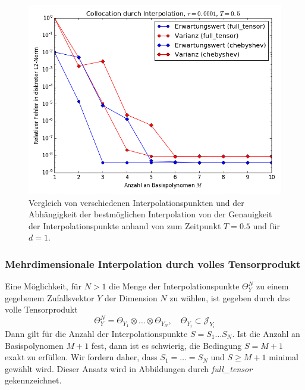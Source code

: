 \begin{mathbsp}
\begin{figure}[!htb]
\endminipage
{}
  \includegraphics[width=\linewidth]{Figures/collocation_mi_trial1_tau0001.png}
\endminipage
\caption{Vergleich von verschiedenen Interpolationspunkten und der Abhängigkeit der bestmöglichen Interpolation von der Genauigkeit der Interpolationspunkte anhand von  zum Zeitpunkt $T=0.5$ und für $d=1$.}
\label{fig:Kollokation_trial1}
\end{figure}
\end{mathbsp}
\subsubsection*{Mehrdimensionale Interpolation durch volles Tensorprodukt}
Eine Möglichkeit, für $N>1$ die Menge der Interpolationspunkte $\Theta_Y^N$ zu einem gegebenem Zufallsvektor $Y$ der Dimension $N$ zu wählen, ist gegeben durch das volle Tensorprodukt
\[\Theta_Y^N=\Theta_{Y_1}\otimes \dots \otimes \Theta_{Y_N},\quad \Theta_{Y_i}\subset \mathcal{J}_{Y_i}\]
Dann gilt für die Anzahl der Interpolationspunkte $S=S_1 \dots S_N$. Ist die Anzahl an Basispolynomen $M+1$ fest, dann ist es schwierig, die Bedingung $S=M+1$ exakt zu erfüllen. Wir fordern daher, dass $S_1=\dots=S_N$ und $S\ge M+1$ minimal gewählt wird. Dieser Ansatz wird in Abbildungen durch \textit{full\_tensor} gekennzeichnet.
